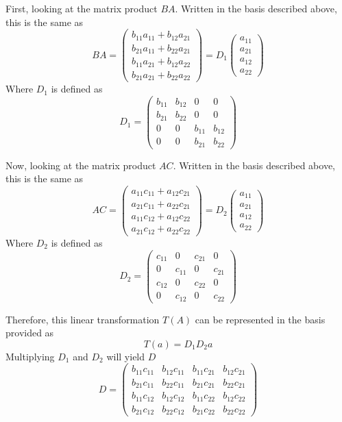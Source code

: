 \documentclass{article}
\begin{document}
\bigbreak

First, looking at the matrix product $ BA $. Written in the basis described
above, this is the same as
$$ BA = \begin{pmatrix}
    b_{11} a_{11} + b_{12} a_{21} \\
    b_{21} a_{11} + b_{22} a_{21} \\
    b_{11} a_{21} + b_{12} a_{22} \\
    b_{21} a_{21} + b_{22} a_{22}
\end{pmatrix} = D_1 \begin{pmatrix}
    a_{11} \\
    a_{21} \\
    a_{12} \\
    a_{22}
\end{pmatrix} $$
Where $ D_1 $ is defined as
$$ D_1 = \begin{pmatrix}
    b_{11} & b_{12} & 0 & 0 \\
    b_{21} & b_{22} & 0 & 0 \\
    0 & 0 & b_{11} & b_{12} \\
    0 & 0 & b_{21} & b_{22}
\end{pmatrix} $$

Now, looking at the matrix product $ AC $. Written in the basis described
above, this is the same as 
$$ AC = \begin{pmatrix}
    a_{11} c_{11} + a_{12} c_{21} \\
    a_{21} c_{11} + a_{22} c_{21} \\
    a_{11} c_{12} + a_{12} c_{22} \\
    a_{21} c_{12} + a_{22} c_{22}
\end{pmatrix} = D_2 \begin{pmatrix}
    a_{11} \\
    a_{21} \\
    a_{12} \\
    a_{22}
\end{pmatrix} $$
Where $ D_2 $ is defined as
$$ D_2 = \begin{pmatrix}
    c_{11} & 0 & c_{21} & 0 \\
    0 & c_{11} & 0 & c_{21} \\
    c_{12} & 0 & c_{22} & 0 \\
    0 & c_{12} & 0 & c_{22}
\end{pmatrix} $$

Therefore, this linear transformation $ T(A) $ can be represented in the
basis provided as
$$ T(a) = D_1 D_2 a $$
Multiplying $ D_1 $ and $ D_2 $ will yield $ D $
$$ D = \begin{pmatrix}
    b_{11} c_{11} & b_{12} c_{11} & b_{11} c_{21} & b_{12} c_{21} \\
    b_{21} c_{11} & b_{22} c_{11} & b_{21} c_{21} & b_{22} c_{21} \\
    b_{11} c_{12} & b_{12} c_{12} & b_{11} c_{22} & b_{12} c_{22} \\
    b_{21} c_{12} & b_{22} c_{12} & b_{21} c_{22} & b_{22} c_{22}
\end{pmatrix} $$
\end{document}
